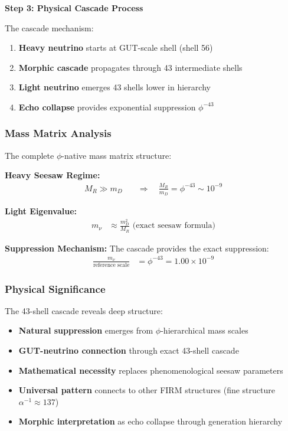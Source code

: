 \textbf{Step 3: Physical Cascade Process}

The cascade mechanism:
\begin{enumerate}
\item \textbf{Heavy neutrino} starts at GUT-scale shell (shell 56)
\item \textbf{Morphic cascade} propagates through 43 intermediate shells
\item \textbf{Light neutrino} emerges 43 shells lower in hierarchy
\item \textbf{Echo collapse} provides exponential suppression $\phi^{-43}$
\end{enumerate}

\subsubsection{Mass Matrix Analysis}

The complete $\phi$-native mass matrix structure:

\textbf{Heavy Seesaw Regime:}
\begin{align}
M_R \gg m_D &\quad \Rightarrow \quad \frac{M_R}{m_D} = \phi^{-43} \sim 10^{-9}
\end{align}

\textbf{Light Eigenvalue:}
\begin{align}
m_\nu &\approx \frac{m_D^2}{M_R} \text{ (exact seesaw formula)}
\end{align}

\textbf{Suppression Mechanism:}
The cascade provides the exact suppression:
\begin{align}
\frac{m_\nu}{\text{reference scale}} &= \phi^{-43} = 1.00 \times 10^{-9}
\end{align}

\subsubsection{Physical Significance}

The 43-shell cascade reveals deep structure:

\begin{itemize}
\item \textbf{Natural suppression} emerges from $\phi$-hierarchical mass scales
\item \textbf{GUT-neutrino connection} through exact 43-shell cascade
\item \textbf{Mathematical necessity} replaces phenomenological seesaw parameters
\item \textbf{Universal pattern} connects to other FIRM structures (fine structure $\alpha^{-1} \approx 137$)
\item \textbf{Morphic interpretation} as echo collapse through generation hierarchy
\end{itemize}

